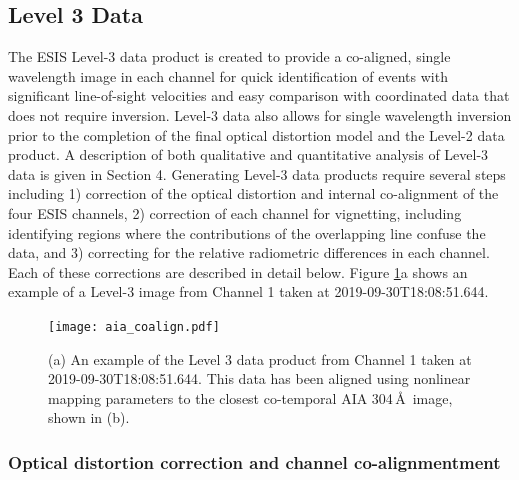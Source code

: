     \subsection{Level 3 Data}
 
    
    	\newcommand{\vigfit}{[0.44, 0.34, 0.38, 0.5]}
    	\newcommand{\levthreetime}{2019-09-30T18:08:51.644}
    	
    	The ESIS Level-3 data product is created to provide a co-aligned, single wavelength image in each channel for quick identification of events with significant line-of-sight velocities and easy comparison with coordinated data that does not require inversion. 
    	Level-3 data also allows for single wavelength inversion prior to the completion of the final optical distortion model and the Level-2 data product.  A description of both qualitative and quantitative analysis of Level-3 data is given in Section 4.  Generating Level-3 data products require several steps including 1) correction of the optical distortion and internal co-alignment of the four ESIS channels, 2) correction of each channel for vignetting, including identifying regions where the contributions of the overlapping \mgxbright line confuse the \ov data, and 3) correcting for the relative radiometric differences in each channel.  Each of these corrections are described in detail below. 
    	Figure \ref{fig:coalign}a shows an example of a Level-3 image from Channel 1 taken at \levthreetime.
    	
  		\begin{figure}[htb!]
    		\centering
    		\texttt{[image: aia\_coalign.pdf]}
    		\caption{(a) An example of the Level 3 data product from Channel 1 taken at \levthreetime. This data has been aligned using nonlinear mapping parameters to the closest co-temporal AIA 304\,\AA\ image, shown in (b).   }
    		\label{fig:coalign}
    	\end{figure}
    	
    
  
  \subsubsection{Optical distortion correction and channel co-alignmentment}
   		

